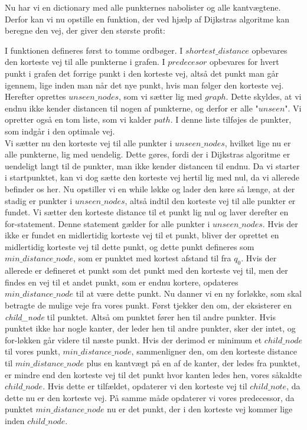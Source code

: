 Nu har vi en dictionary med alle punkternes nabolister og alle kantvægtene. Derfor kan vi nu opstille en funktion, der ved hjælp af Dijkstras algoritme kan beregne den vej, der giver den største profit:



I funktionen defineres først to tomme ordbøger. I $shortest\_distance$ opbevares den korteste vej til alle punkterne i grafen. I $predecesor$ opbevares for hvert punkt i grafen det forrige punkt i den korteste vej, altså det punkt man går igennem, lige inden man når det nye punkt, hvis man følger den korteste vej. Herefter oprettes $unseen\_nodes$, som vi sætter lig med $graph$. Dette skyldes, at vi endnu ikke kender distancen til nogen af punkterne, og derfor er alle "$unseen$". Vi opretter også en tom liste, som vi kalder $path$. I denne liste tilføjes de punkter, som indgår i den optimale vej.\\
Vi sætter nu den korteste vej til alle punkter i $unseen\_nodes$, hvilket lige nu er alle punkterne, lig med uendelig. Dette gøres, fordi der i Dijkstras algoritme er uendeligt langt til de punkter, man ikke kender distancen til endnu. Da vi starter i startpunktet, kan vi dog sætte den korteste vej hertil lig med nul, da vi allerede befinder os her.
Nu opstiller vi en while løkke og lader den køre så længe, at der stadig er punkter i $unseen\_nodes$, altså indtil den korteste vej til alle punkter er fundet.
Vi sætter den korteste distance til et punkt lig nul og laver derefter en for-statement. Denne statement gælder for alle punkter i $unseen\_nodes$. Hvis der ikke er fundet en midlertidig korteste vej til et punkt, bliver der oprettet en midlertidig korteste vej til dette punkt, og dette punkt defineres som $min\_distance\_node$, som er punktet med kortest afstand til fra $q_0$. Hvis der allerede er defineret et punkt som det punkt med den korteste vej til, men der findes en vej til et andet punkt, som er endnu kortere, opdateres $min\_distance\_node$ til at være dette punkt.
Nu danner vi en ny forløkke, som skal betragte de mulige veje fra vores punkt.
Først tjekker den om, der eksisterer en \emph{child\_node} til punktet. Altså om punktet fører hen til andre punkter. Hvis punktet ikke har nogle kanter, der leder hen til andre punkter, sker der intet, og for-løkken går videre til næste punkt.
Hvis der derimod er minimum et $child\_node$ til vores punkt, $min\_distance\_node$, sammenligner den, om den korteste distance til $min\_distance\_node$ plus en kantvægt på en af de kanter, der ledes fra punktet, er mindre end den korteste vej til det punkt hvor kanten ledes hen, vores såkaldte $child\_node$. Hvis dette er tilfældet, opdaterer vi den korteste vej til $child\_note$, da dette nu er den korteste vej. På samme måde opdaterer vi vores predecessor, da punktet $min\_distance\_node$ nu er det punkt, der i den korteste vej kommer lige inden $child\_node$.\\

